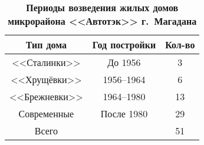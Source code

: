 
\begin{wraptable}{l}{7.0cm}
  \caption*{\textbf{Периоды возведения жилых домов\\микрорайона <<Автотэк>> г.~Магадана} }
  \label{tab:sydchak-tab}
  \begin{tabular}{ccc}
\toprule
  Тип дома    & Год постройки & Кол-во \\
\midrule
  <<Сталинки>>    & До 1956       & 3      \\
  <<Хрущёвки>>    & 1956--1964     & 6      \\
  <<Брежневки>>   & 1964--1980     & 13     \\
  Современные & После 1980    & 29     \\\midrule
  Всего       &               & 51\\ \bottomrule
  \end{tabular}


\end{wraptable}
